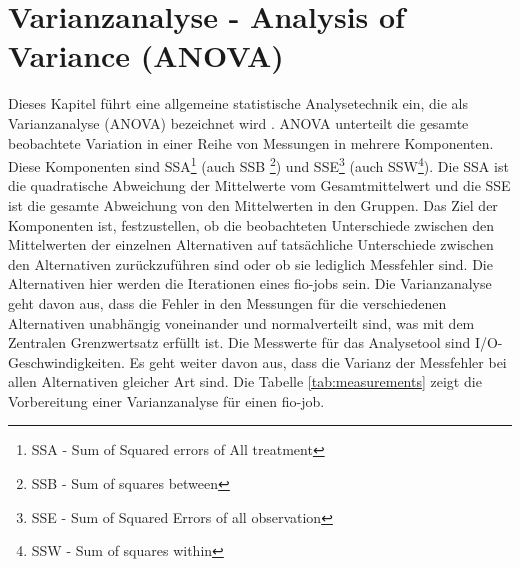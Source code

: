 \section{Varianzanalyse - Analysis of Variance (ANOVA)}
 
Dieses Kapitel führt eine allgemeine statistische Analysetechnik ein, die als Varianzanalyse (ANOVA) bezeichnet wird \cite{Lilja_2000}. 
ANOVA unterteilt die gesamte beobachtete Variation in einer Reihe von Messungen in mehrere Komponenten.
Diese Komponenten sind SSA\footnote{SSA - Sum of Squared errors of All treatment} (auch SSB \footnote{SSB - Sum of squares between}) und SSE\footnote{SSE - Sum of Squared Errors of all observation}
 (auch SSW\footnote{SSW - Sum of squares within}).
Die SSA  ist die quadratische Abweichung der Mittelwerte vom Gesamtmittelwert und die SSE
ist die gesamte Abweichung von den Mittelwerten in den Gruppen.
Das Ziel der Komponenten ist, festzustellen, ob die beobachteten Unterschiede zwischen den Mittelwerten der einzelnen Alternativen auf tatsächliche 
Unterschiede zwischen den Alternativen zurückzuführen sind oder ob sie lediglich Messfehler sind.
Die Alternativen hier werden die Iterationen eines fio-jobs sein.
Die Varianzanalyse geht davon aus, dass die Fehler in den Messungen für die verschiedenen Alternativen
unabhängig voneinander und normalverteilt sind, was mit dem Zentralen Grenzwertsatz erfüllt ist.
Die Messwerte für das Analysetool sind I/O-Geschwindigkeiten.
Es geht weiter davon aus, dass die Varianz der Messfehler bei allen Alternativen gleicher Art sind.
Die Tabelle \ref{tab:measurements} zeigt die Vorbereitung einer Varianzanalyse für einen fio-job.

